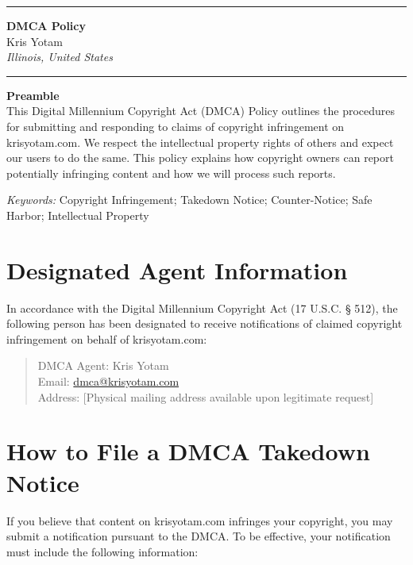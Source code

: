 \documentclass[11pt]{article}
\newcommand{\TitleLine}{\noindent\rule{\textwidth}{0.4pt}}
\begin{document}
\onehalfspacing

\vspace*{-1em}
\TitleLine
\vspace{0.5em}
\begin{center}
  {\Large\bfseries DMCA Policy}\\[0.75em]
  {\normalsize Kris Yotam}\\
  {\itshape Illinois, United States}
\end{center}
\vspace{0.5em}
\TitleLine

\vspace{1.5em}

\noindent\textbf{Preamble}\\
This Digital Millennium Copyright Act (DMCA) Policy outlines the procedures for submitting and responding to claims of copyright infringement on krisyotam.com. We respect the intellectual property rights of others and expect our users to do the same. This policy explains how copyright owners can report potentially infringing content and how we will process such reports.

\vspace{0.75em}
\noindent\textit{Keywords:} Copyright Infringement; Takedown Notice; Counter-Notice; Safe Harbor; Intellectual Property

\vspace{1.5em}

\section{Designated Agent Information}
In accordance with the Digital Millennium Copyright Act (17 U.S.C. § 512), the following person has been designated to receive notifications of claimed copyright infringement on behalf of krisyotam.com:

\begin{quote}
  DMCA Agent: Kris Yotam\\
  Email: \href{mailto:dmca@krisyotam.com}{dmca@krisyotam.com}\\
  Address: [Physical mailing address available upon legitimate request]
\end{quote}

\section{How to File a DMCA Takedown Notice}
If you believe that content on krisyotam.com infringes your copyright, you may submit a notification pursuant to the DMCA. To be effective, your notification must include the following information:
\end{document}
